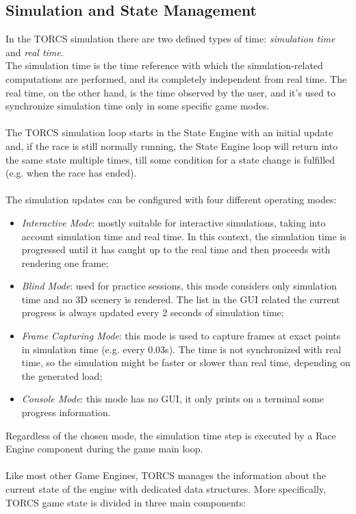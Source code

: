 \subsection{Simulation and State Management}\label{torcs-state-management}
In the TORCS simulation there are two defined types of time: \textit{simulation time} and \textit{real time}. \\
The simulation time is the time reference with which the simulation-related computations are performed, and its completely independent from real time. The real time, on the other hand, is the time observed by the user, and it's used to synchronize simulation time only in some specific game modes. \\ \\
The TORCS simulation loop starts in the State Engine with an initial update and, if the race is still normally running, the State Engine loop will return into the same state multiple times, till some condition for a state change is fulfilled (e.g. when the race has ended). \\ \\
The simulation updates can be configured with four different operating modes:
\begin{itemize}
	\item \textit{Interactive Mode}: mostly suitable for interactive simulations, taking into account simulation time and real time. In this context, the simulation time is progressed until it has caught up to the real time and then proceeds with rendering one frame;
	\item \textit{Blind Mode}: used for practice sessions, this mode considers only simulation time and no 3D scenery is rendered. The list in the GUI related the current progress is always updated every 2 seconds of simulation time;
	\item \textit{Frame Capturing Mode}: this mode is used to capture frames at exact points in simulation time (e.g. every 0.03s). The time is not synchronized with real time, so the simulation might be faster or slower than real time, depending on the generated load;
	\item \textit{Console Mode}: this mode has no GUI, it only prints on a terminal some progress information.
\end{itemize}
Regardless of the chosen mode, the simulation time step is executed by a Race Engine component during the game main loop. \\ \\
Like most other Game Engines, TORCS manages the information about the current state of the engine with dedicated data structures. More specifically, TORCS game state is divided in three main components:

